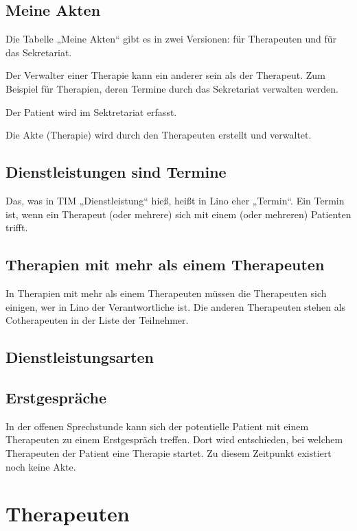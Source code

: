 \documentclass[letterpaper,10pt,ngerman]{sphinxmanual}
\begin{document}
\section{Meine Akten}
\label{\detokenize{intro:meine-akten}}
Die Tabelle „Meine Akten“ gibt es in zwei Versionen: für Therapeuten
und für das Sekretariat.

Der Verwalter einer Therapie kann ein anderer sein als der
Therapeut. Zum Beispiel für Therapien, deren Termine durch das
Sekretariat verwalten werden.

Der Patient wird im Sektretariat erfasst.

Die Akte (Therapie) wird durch den Therapeuten erstellt und verwaltet.


\section{Dienstleistungen sind Termine}
\label{\detokenize{intro:dienstleistungen-sind-termine}}
Das, was in TIM „Dienstleistung“ hieß, heißt in Lino eher „Termin“.
Ein Termin ist, wenn ein Therapeut (oder mehrere) sich mit einem (oder
mehreren) Patienten trifft.


\section{Therapien mit mehr als einem Therapeuten}
\label{\detokenize{intro:therapien-mit-mehr-als-einem-therapeuten}}
In Therapien mit mehr als einem Therapeuten müssen die Therapeuten
sich einigen, wer in Lino der Verantwortliche ist.  Die anderen
Therapeuten stehen als Cotherapeuten in der Liste der Teilnehmer.


\section{Dienstleistungsarten}
\label{\detokenize{intro:dienstleistungsarten}}

\section{Erstgespräche}
\label{\detokenize{intro:erstgesprache}}
In der offenen Sprechstunde kann sich der potentielle
Patient mit einem Therapeuten zu einem Erstgespräch treffen.  Dort
wird entschieden, bei welchem Therapeuten der Patient eine Therapie
startet.  Zu diesem Zeitpunkt existiert noch keine Akte.


\chapter{Therapeuten}
\label{\detokenize{the/index:therapeuten}}\label{\detokenize{the/index::doc}}
\end{document}
